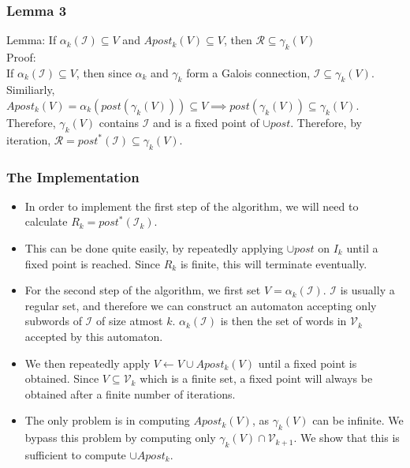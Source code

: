 \documentclass{beamer}
\begin{document}
{        \begin{frame}
            \frametitle{Lemma 3}
            Lemma: If $\alpha_{k}(\mathcal{I}) \subseteq V$ and $Apost_{k}(V) \subseteq V$, then $\mathcal{R} \subseteq \gamma_{k}(V)$\\
            Proof:\\
            If $\alpha_{k}(\mathcal{I}) \subseteq V$, then since $\alpha_{k}$ and $\gamma_{k}$ form a Galois connection, $\mathcal{I} \subseteq \gamma_{k}(V)$.
            Similiarly, $Apost_{k}(V) = \alpha_{k}(post(\gamma_{k}(V))) \subseteq V \implies post(\gamma_{k}(V)) \subseteq \gamma_{k}(V)$. Therefore, $\gamma_{k}(V)$ contains $\mathcal{I}$ 
            and is a fixed point of $\cup post$. Therefore, by iteration, $\mathcal{R} = post^{*}(\mathcal{I}) \subseteq \gamma_{k}(V)$.
        \end{frame}

        \begin{frame}
            \frametitle{The Implementation}
            \begin{itemize}
                \item In order to implement the first step of the algorithm, we will need to calculate $R_{k} = post^{*}(\mathcal{I}_{k})$.
                \item This can be done quite easily, by repeatedly applying $\cup post$ on $I_{k}$ until a fixed point is reached. Since $R_{k}$ is finite, this will terminate eventually.
                \item For the second step of the algorithm, we first set $V = \alpha_{k}(\mathcal{I})$. $\mathcal{I}$ is usually a regular set, and therefore we can construct an automaton accepting only subwords of $\mathcal{I}$ of size atmost $k$. $\alpha_{k}(\mathcal{I})$ is then the set of words in $\mathcal{V}_{k}$ accepted by this automaton. 
                \item We then repeatedly apply $V \leftarrow V \cup Apost_{k}(V)$ until a fixed point is obtained. Since $V \subseteq \mathcal{V}_{k}$ which is a finite set, a fixed point will always be obtained after a finite number of iterations.
                \item The only problem is in computing $Apost_{k}(V)$, as $\gamma_{k}(V)$ can be infinite. We bypass this problem by computing only $\gamma_{k}(V) \cap \mathcal{V}_{k + 1}$. We show that this is sufficient 
                to compute $\cup Apost_{k}$.
            \end{itemize}
        \end{frame}

}
\end{document}
